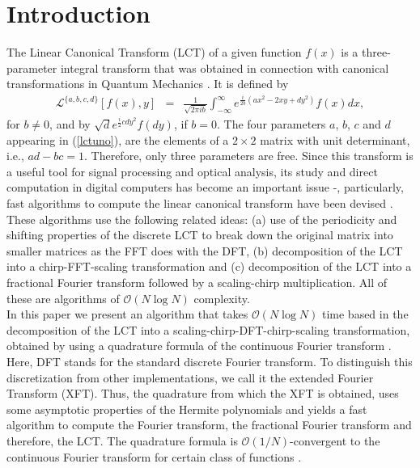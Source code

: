 \documentclass[12pt]{article}
\begin{document}
\section{Introduction}\label{intro}
The Linear Canonical Transform (LCT) of a given function $f(x)$ is a three-parameter integral transform that was obtained in connection with canonical transformations in Quantum Mechanics \cite{Mos71, Wol79}. It is defined by
\begin{eqnarray}\label{lctuno}
{\mathcal L}^{\{a,b,c,d\}}[f(x),y]&=&\frac{1}{\sqrt{2\pi i  b}}\int_{-\infty}^\infty e^{\frac{i}{2b}(ax^2-2xy+dy^2)}f(x)dx,\nonumber
\end{eqnarray}
for $b\ne0$, and by $\sqrt{d} e^{\frac{i}{2}cdy^2} f(dy)$, if $b=0$. The four parameters $a$, $b$, $c$ and $d$ appearing in (\ref{lctuno}), are the elements of a $2\times 2$ matrix with unit determinant, i.e., $ad-bc=1$. Therefore, only three parameters are free. Since this transform is a useful tool for signal processing and optical analysis, its study and direct computation in digital computers has become an important issue \cite{Hea09}-\cite{Pei05}, particularly, fast algorithms to compute the linear canonical transform have been devised \cite{Koc08, Hen05}. These algorithms use the following related ideas: (a) use of the periodicity and shifting properties of the discrete LCT to break down the original matrix into smaller matrices as the FFT does with the DFT, (b) decomposition of the LCT into a chirp-FFT-scaling transformation and (c) decomposition of the LCT into a fractional Fourier transform followed by a scaling-chirp multiplication. All of these are algorithms of ${\mathcal O}(N\log N)$ complexity.\\
In this paper we present an algorithm that takes ${\mathcal O}(N\log N)$ time based in the decomposition of the LCT into a scaling-chirp-DFT-chirp-scaling transformation, obtained by using a quadrature formula of the continuous Fourier transform \cite{Cam09, Cam92}.  Here, DFT stands for the standard discrete Fourier transform. To distinguish this discretization from other implementations, we call it  the extended Fourier Transform (XFT). 
Thus, the quadrature from which the XFT is obtained, uses some asymptotic properties of the Hermite polynomials and yields a fast algorithm to compute the Fourier transform, the fractional Fourier transform and therefore, the LCT. The quadrature formula is ${\mathcal O}(1/N)$-convergent to the continuous Fourier transform for certain class of functions \cite{Cam95}.
\end{document}
